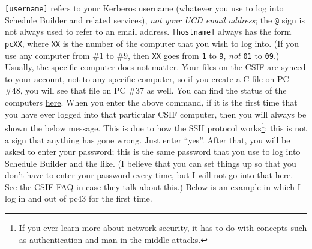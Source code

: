 \documentclass{article}
\begin{document}
\lstinline{[username]} refers to your Kerberos username (whatever you use to log into Schedule Builder and related services), \textit{not your UCD email address}; the \lstinline{@} sign is not always used to refer to an email address. \lstinline{[hostname]} always has the form \lstinline{pcXX}, where \lstinline{XX} is the number of the computer that you wish to log into. (If you use any computer from \#1 to \#9, then \lstinline{XX} goes from \lstinline{1} to \lstinline{9}, \textit{not} \lstinline{01} to \lstinline{09}.) Usually, the specific computer does not matter. Your files on the CSIF are synced to your account, not to any specific computer, so if you create a C file on PC \#48, you will see that file on PC \#37 as well. You can find the status of the computers \href{http://iceman.cs.ucdavis.edu/nagios3/cgi-bin/status.cgi?hostgroup=all}{here}. When you enter the above command, if it is the first time that you have ever logged into that particular CSIF computer, then you will always be shown the below message. This is due to how the SSH protocol works\footnote{If you ever learn more about network security, it has to do with concepts such as authentication and man-in-the-middle attacks.}; this is not a sign that anything has gone wrong. Just enter ``yes''. After that, you will be asked to enter your password; this is the same password that you use to log into Schedule Builder and the like. (I believe that you can set things up so that you don't have to enter your password every time, but I will not go into that here. See the CSIF FAQ in case they talk about this.) Below is an example in which I log in and out of pc43 for the first time.
\end{document}
